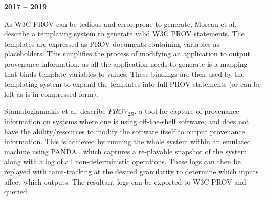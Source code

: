 \textbf{2017 -- 2019}

As W3C PROV can be tedious and error-prone to generate, Moreau et al. \cite{Moreau2018} describe a templating system to generate valid W3C PROV statements. The templates are expressed as PROV documents containing variables as placeholders. This simplifies the process of modifying an application to output provenance information, as all the application needs to generate is a mapping that binds template variables to values. These bindings are then used by the templating system to expand the templates into full PROV statements (or can be left as is in compressed form).

Stamatogiannakis et al. \cite{Stamatogiannakis2017} describe ${PROV}_{2R}$, a tool for capture of provenance information on systems where one is using off-the-shelf software, and does not have the ability/resources to modify the software itself to output provenance information. This is achieved by running the whole system within an emulated machine using PANDA \cite{Dolan-Gavitt2015}, which captures a re-playable snapshot of the system along with a log of all non-deterministic operations. These logs can then be replayed with taint-tracking at the desired granularity to determine which inputs affect which outputs. The resultant logs can be exported to W3C PROV and queried.

